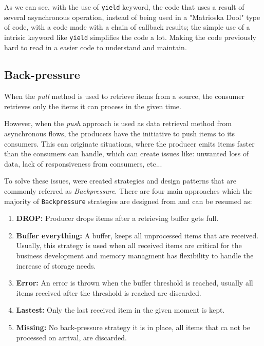 As we can see, with the use of \texttt{yield} keyword, the code that uses a result of several asynchronous operation, instead of being used in a "Matrioska Dool" type of code, with a code made with a chain of callback results; 
the simple use of a intrisic keyword like \texttt{yield} simplifies the code a lot. Making the code previously hard to read in a easier code to understand and maintain.  
	
	\clearpage

	\subsection{Back-pressure} 

	When the \textit{pull} method is used to retrieve items from a source, the consumer retrieves only the items it can process in the given time. 
	
	However, when the \textit{push} approach is used as data retrieval method from asynchronous flows, the producers have the initiative to push items to its consumers. 
	This can originate situations, where the producer emits items faster than the consumers can handle, which can create issues like: unwanted loss of data, lack of responsiveness from consumers, etc... 
	
	To solve these issues, were created strategies and design patterns that are commonly referred as \textit{Backpressure}.
	There are four main approaches which the majority of \texttt{Backpressure} strategies are designed from and can be resumed as: 
	
	\begin{enumerate}
		\item \textbf{DROP:} Producer drops items after a retrieving buffer gets full.
		\item \textbf{Buffer everything:} A buffer, keeps all unprocessed items that are received. Usually, this strategy is used when all received items are critical for the business development and memory managment has flexibility to handle the increase of storage needs.
		\item \textbf{Error:} An error is thrown when the buffer threshold is reached, usually all items received after the threshold is reached are discarded.
		\item \textbf{Lastest:} Only the last received item in the given moment is kept.
		\item \textbf{Missing:} No back-pressure strategy it is in place, all items that ca not be processed on arrival, are discarded.
	\end{enumerate}
	\clearpage

